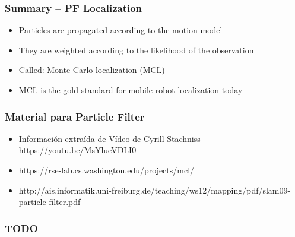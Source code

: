 \begin{frame}
    \frametitle{Summary – PF Localization}
    \begin{itemize}
        \item Particles are propagated according to the motion model
        \item They are weighted according to the likelihood of the observation
        \item Called: Monte-Carlo localization (MCL)
        \item MCL is the gold standard for mobile robot localization today
    \end{itemize}
\end{frame}



\begin{frame}
    \frametitle{Material para Particle Filter}
    
    \begin{itemize}
        \item Información extraída de Vídeo de Cyrill Stachniss https://youtu.be/MsYlueVDLI0
        \item https://rse-lab.cs.washington.edu/projects/mcl/
        \item http://ais.informatik.uni-freiburg.de/teaching/ws12/mapping/pdf/slam09-particle-filter.pdf
    \end{itemize}
   
\end{frame}


\begin{frame}
    \frametitle{TODO}
    
    
    
\end{frame}


    
